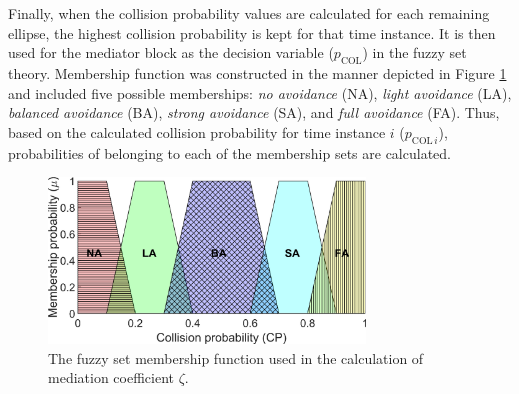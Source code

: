 Finally, when the collision probability values are calculated for each remaining ellipse, the highest collision probability is kept for that time instance. It is then used for the mediator block as the decision variable ($p_{\textrm{COL}}$) in the fuzzy set theory. Membership function was constructed in the manner depicted in Figure \ref{Fig:Fuzzy} and included five possible memberships:  \emph{no avoidance} (NA), \emph{light avoidance} (LA), \emph{balanced avoidance} (BA), \emph{strong avoidance} (SA), and \emph{full avoidance} (FA). Thus, based on the calculated collision probability for time instance $i$ ($p_{\textrm{COL}\,i}$), probabilities of belonging to each of the membership sets are calculated. 

\begin{figure}
    \centering
    \includegraphics[width=0.75\textwidth]{slike/Fig03_13.png}
    \caption{The fuzzy set membership function used in the calculation of mediation coefficient $\zeta$.} 
    \label{Fig:Fuzzy}
\end{figure}


